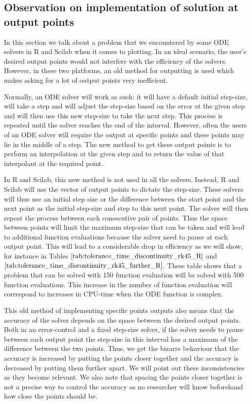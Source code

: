 \subsection{Observation on implementation of solution at output points}
\label{subsection:solution_output_points_impl}
In this section we talk about a problem that we encountered by some ODE solvers in R and Scilab when it comes to plotting. In an ideal scenario, the user's desired output points would not interfere with the efficiency of the solvers. However, in these two platforms, an old method for outputting is used which makes asking for a lot of output points very inefficient.

Normally, an ODE solver will work as such: it will have a default initial step-size, will take a step and will adjust the step-size based on the error at the given step and will then use this new step-size to take the next step. This process is repeated until the solver reaches the end of the interval. However, often the users of an ODE solver will require the output at specific points and these points may lie in the middle of a step. The new method to get these output points is to perform an interpolation at the given step and to return the value of that interpolant at the required point.

In R and Scilab, this new method is not used in all the solvers. Instead, R and Scilab will use the vector of output points to dictate the step-size. These solvers will thus use an initial step size or the difference between the start point and the next point as the initial step-size and step to this next point. The solver will then repeat the process between each consecutive pair of points. Thus the space between points will limit the maximum step-size that can be taken and will lead to additional function evaluations because the solver need to pause at each output point. This will lead to a considerable drop in efficiency as we will show, for instance in Tables $\ref{tab:tolerance_time_discontinuity_rk45_R}$ and $\ref{tab:tolerance_time_discontinuity_rk45_further_R}$. These table shows that a problem that can be solved with 150 function evaluation will be solved with 500 function evaluations. This increase in the number of function evaluation will correspond to increases in CPU-time when the ODE function is complex.   

This old method of implementing specific points outputs also means that the accuracy of the solver depends on the space between the desired output points. Both in an error-control and a fixed step-size solver, if the solver needs to pause between each output point the step-size in this interval has a maximum of the difference between the two points. Thus, we get the bizarre behaviour that the accuracy is increased by putting the points closer together and the accuracy is decreased by putting them further apart. We will point out these inconsistencies as they become relevant. We also note that spacing the points closer together is not a precise way to control the accuracy as no researcher will know beforehand how close the points should be.

